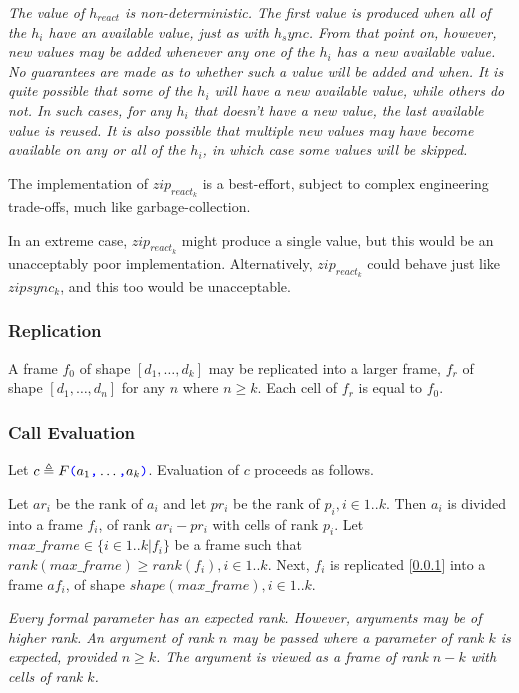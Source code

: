 \documentclass{article}
\begin{document}
{\em
The value of $h_{react}$ is non-deterministic. The first value is produced when all of the $h_i$ have an available value, just as with $h_sync$. From that point on, however,
new values may be added whenever any one of the $h_i$ has a new available value. No guarantees are made as to whether such a value will be added and when. It is quite possible that some of the $h_i$ will have a new available value, while others do not. In such cases, for any $h_i$ that doesn't have a new value,  the last available value is reused.
It is also possible that multiple new values may have become available on any or all of the $h_i$, in which case some values will be skipped.

The implementation of $zip_{react_k}$ is a best-effort, subject to complex engineering trade-offs, much like garbage-collection.

In an extreme case, $zip_{react_k}$ might produce a single value, but this would be an unacceptably poor implementation. Alternatively, $zip_{react_k}$ could behave just like 
$zip{sync_k}$, and this too would be unacceptable.
}

\subsubsection{Replication}
\label{replication}

A frame $f_0$ of shape $[d_1, \ldots, d_k]$ may be replicated into a larger frame, $f_r$ of shape $[d_1, \ldots, d_n]$ for any $n$ where $n \ge k$. Each cell of $f_r$ is equal to $f_0$.




\subsubsection{Call Evaluation}
\label{callEvaluation}


Let $c \triangleq F\texttt{\color{blue} (}{}a_1\texttt{\color{blue} ,}{} \ldots\texttt{\color{blue} ,}{} a_k\texttt{\color{blue} )}$. Evaluation of $c$ proceeds as follows. 

Let $ar_i$ be the rank of $a_i$ and let $pr_i$ be the rank of $p_i, i \in 1.. k$. Then  $a_i$ is divided into a frame $f_i$, of rank $ar_i - pr_i$ with cells of rank $p_i$. Let $max\_frame \in \{i \in 1..k | f_i\}$ be a frame such that $rank(max\_frame) \ge rank(f_i), i \in 1 ..k$. Next, $f_i$ is replicated [\ref{replication}] into a frame $af_i$, of shape $shape(max\_frame), i \in 1..k$. 

{\em
Every formal parameter has an expected rank. However, arguments may be of higher rank. An argument of rank $n$ may be passed where a parameter of rank $k$ is expected, provided $n \ge k$. The argument is viewed as a frame of rank $n-k$ with cells of rank $k$. 
}
\end{document}
